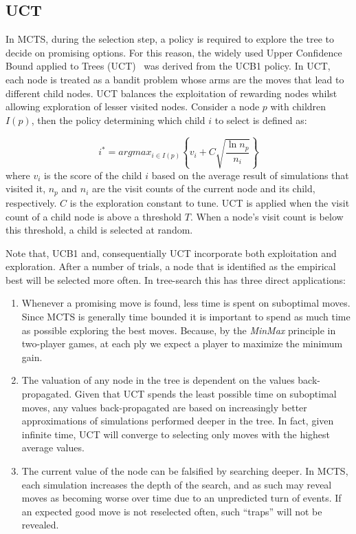 \documentclass{kecsmstr}
\begin{document}
\subsection{UCT}
In MCTS, during the selection step, a policy is required to explore the tree to decide on promising options. For this reason, the widely used Upper Confidence Bound applied to Trees (UCT)~ was derived from the UCB1 policy. In UCT, each node is treated as a bandit problem whose arms are the moves that lead to different child nodes. UCT balances the exploitation of rewarding nodes whilst allowing exploration of lesser visited nodes. Consider a node $p$ with children $I(p)$, then the policy determining which child $i$ to select is defined as:

\begin{equation}
\label{eq:uct}
i^* = argmax_{i \in I(p)}\left\{ v_i + C \sqrt{ \frac{\ln{n_p}}{n_i}}\right\}
\end{equation}
where $v_i$ is the score of the child $i$ based on the average result of simulations that visited it, $n_p$ and $n_i$ are the visit counts of the current node and its child, respectively. $C$ is the exploration constant to tune. UCT is applied when the visit count of a child node is above a threshold $T$. When a node's visit count is below this threshold, a child is selected at random.

Note that, UCB1 and, consequentially UCT incorporate both exploitation and exploration. After a number of trials, a node that is identified as the empirical best will be selected more often. In tree-search this has three direct applications:
\begin{enumerate} 

\item Whenever a promising move is found, less time is spent on suboptimal moves. Since MCTS is generally time bounded it is important to spend as much time as possible exploring the best moves. Because, by the \emph{MinMax} principle in two-player games, at each ply we expect a player to maximize the minimum gain.

\item The valuation of any node in the tree is dependent on the values back-propagated. Given that UCT spends the least possible time on suboptimal moves, any values back-propagated are based on increasingly better approximations of simulations performed deeper in the tree. In fact, given infinite time, UCT will converge to selecting only moves with the highest average values.

\item The current value of the node can be falsified by searching deeper. In MCTS, each simulation increases the depth of the search, and as such may reveal moves as becoming worse over time due to an unpredicted turn of events. If an expected good move is not reselected often, such ``traps'' will not be revealed.

\end{enumerate}
\end{document}
